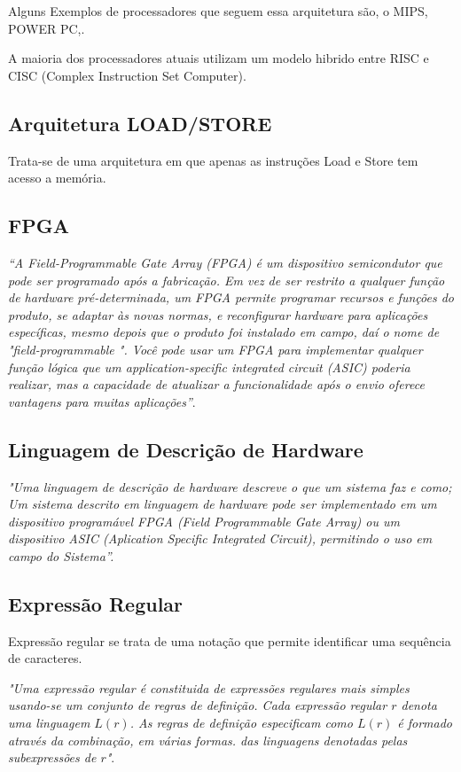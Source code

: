 Alguns Exemplos de processadores que seguem essa arquitetura são, o
MIPS, POWER PC,.

A maioria dos processadores atuais utilizam um modelo hibrido entre
RISC e CISC (Complex Instruction Set Computer).

\subsection{Arquitetura LOAD/STORE}

Trata-se de uma arquitetura em que apenas as instruções Load e Store
tem acesso a memória.

\subsection{FPGA}

\textit{“A
Field-Programmable
Gate
Array
(FPGA)
é
um
dispositivo
semicondutor que pode ser programado após a fabricação. Em vez de ser
restrito a qualquer função de hardware pré-determinada, um FPGA permite
programar recursos e funções do produto, se adaptar às novas normas, e
reconfigurar hardware para aplicações específicas, mesmo depois que o
produto foi instalado em campo, daí o nome de "field-programmable ". Você
pode usar um FPGA para implementar qualquer função lógica que um
application-specific integrated circuit (ASIC) poderia realizar, mas a capacidade
de atualizar a funcionalidade após o envio oferece vantagens para muitas
aplicações”}. \citep{Altera2015FPGA}


\subsection{Linguagem de Descrição de Hardware}

\textit{"Uma linguagem de descrição de hardware descreve o que um sistema faz e
como;
Um sistema descrito em linguagem de hardware pode ser implementado
em um dispositivo programável FPGA (Field Programmable Gate Array) ou um
dispositivo ASIC (Aplication Specific Integrated Circuit), permitindo o uso em
campo do Sistema”.} \citep{CASILLO}

\subsection{Expressão Regular}

Expressão regular se trata de uma notação que permite identificar uma sequência de caracteres.

\textit{"Uma expressão regular é constituida de expressões regulares mais simples usando-se um conjunto de regras de definição. Cada expressão regular $r$ denota uma linguagem $L(r)$. As regras de definição especificam como $L(r)$ é formado através da combinação, em várias formas. das linguagens denotadas pelas subexpressões de $r$"}. \citep[p.43]{aho2008compiladores}

